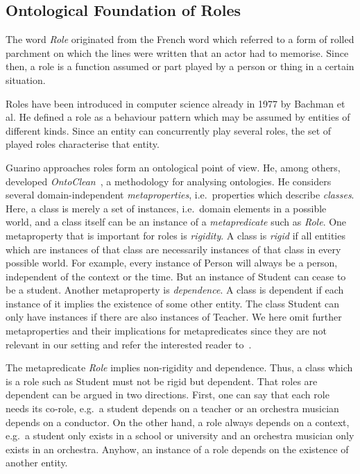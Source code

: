 \subsection{Ontological Foundation of Roles}
\label{sec:rosiroles}

The word \emph{Role} originated from the French word \emph{\Rosirole} which referred to a form of
rolled parchment on which the lines were written that an actor had to memorise.  Since then, a role is a
function assumed or part played by a person or thing in a certain situation.

Roles have been introduced in computer science already in 1977 by Bachman et al. He defined a role
as a behaviour pattern which may be assumed by entities of different kinds. Since an entity can
concurrently play several roles, the set of played roles characterise that entity.

Guarino approaches roles form an ontological point of view. He, among others, developed
\emph{OntoClean}~\cite{GuW-HoO09}, a methodology for analysing ontologies. He considers several
domain-independent \emph{metaproperties}, i.e.\ properties which describe \emph{classes}. Here, a
class is merely a set of instances, i.e.\ domain elements in a possible world, and a class itself
can be an instance of a \emph{metapredicate} such as \emph{Role}.
%
One metaproperty that is important for roles is \emph{rigidity}. A class is \emph{rigid} if all
entities which are instances of that class are necessarily instances of that class in every possible
world. For example, every instance of Person will always be a person, independent of the context or
the time. But an instance of Student can cease to be a student.
%
Another metaproperty is \emph{dependence}.  A class is dependent if each instance of it implies the
existence of some other entity. The class Student can only have instances if there are also
instances of Teacher.
%
We here omit further metaproperties and their implications for metapredicates since they are not
relevant in our setting and refer the interested reader
to~\cite{GuW-EKAW00,GuW00,GuW-CM00,WeG-DKE01}.

The metapredicate \emph{Role} implies non-rigidity and dependence. Thus, a class which is a
role such as Student must not be rigid but dependent. That roles are dependent can be argued in two
directions. First, one can say that each role needs its co-role, e.g.\ a student depends on a teacher
or an orchestra musician depends on a conductor. On the other hand, a role always depends on a
context, e.g.\ a student only exists in a school or university and an orchestra musician only exists
in an orchestra.  Anyhow, an instance of a role depends on the existence of another entity.

